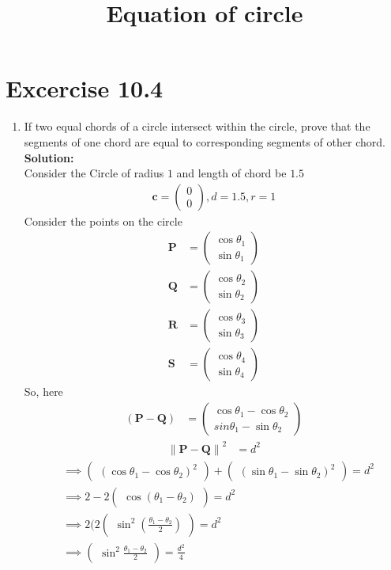 \documentclass[12pt]{article}
\providecommand{\norm}[1]{\left\lVert#1\right\rVert}
\newcommand{\solution}{\noindent \textbf{Solution: }}
\newcommand{\myvec}[1]{\ensuremath{\begin{pmatrix}#1\end{pmatrix}}}
\let\vec\mathbf
\begin{document}
\begin{center}
\title{\textbf{Equation  of circle}}
\date{\vspace{-5ex}} %
\maketitle
\end{center}
\setcounter{page}{1}
\section*{Excercise 10.4}
\begin{enumerate}
\item If two equal chords of a circle intersect within the circle, prove that the segments of one chord are equal to corresponding segments of other chord.
\\
\solution
\\
Consider the Circle of radius $1$ and length of chord be $1.5$
\begin{align}
\vec{c}=\myvec{0\\0},d=1.5,r=1
\end{align}
Consider the points on the circle
\begin{align}
	\vec{P}&=\myvec{\cos\theta_1\\\sin\theta_1}\\
	\vec{Q}&=\myvec{\cos\theta_2\\\sin\theta_2}\\
	\vec{R}&=\myvec{\cos\theta_3\\\sin\theta_3}\\
	\vec{S}&=\myvec{\cos\theta_4\\\sin\theta_4}
\end{align}
So, here
\begin{align}
	(\vec{P}-\vec{Q})&=\myvec{\cos\theta_1-\cos\theta_2\\sin\theta_1-\sin\theta_2}
	\end{align}
	\begin{align}
	\norm{\vec{P}-\vec{Q}}^2&=d^2
		\end{align}
		\begin{align*}
	&\implies\myvec{(\cos\theta_1-\cos\theta_2)^2}+\myvec{(\sin\theta_1-\sin\theta_2)^2}=d^2\\
	&\implies2-2\myvec{\cos(\theta_1-\theta_2)}=d^2\\
	&\implies2(2\myvec{\sin^2(\frac{\theta_1-\theta_2}{2})}=d^2\\
	&\implies\myvec{\sin^2\frac{\theta_1-\theta_2}{2}}=\frac{d^2}{4}\\

\end{align*}
\end{enumerate}
\end{document}
